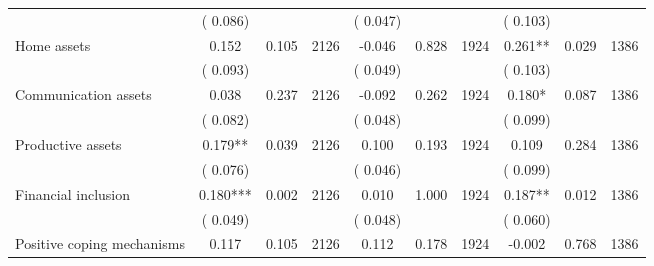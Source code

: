 \begin{tabular}{l*{9}{c}}
                               &        (       0.086) & &                                                                 &       (       0.047) & &                                                          &       (       0.103) & &  \\ 
 Home assets                 &              0.152          &        0.105 & 2126          &             -0.046 &        0.828 & 1924                   &        0.261** &        0.029 & 1386                 \\ 
                               &        (       0.093) & &                                                                 &       (       0.049) & &                                                          &       (       0.103) & &  \\ 
 Communication assets                 &              0.038          &        0.237 & 2126          &             -0.092 &        0.262 & 1924                   &        0.180* &        0.087 & 1386                 \\ 
                               &        (       0.082) & &                                                                 &       (       0.048) & &                                                          &       (       0.099) & &   \\ 
 Productive assets                 &              0.179**          &        0.039 & 2126          &              0.100 &        0.193 & 1924                   &        0.109 &        0.284 & 1386                 \\ 
                               &        (       0.076) & &                                                                 &       (       0.046) & &                                                          &       (       0.099) & &   \\ 
 Financial inclusion                 &              0.180***          &        0.002 & 2126          &              0.010 &        1.000 & 1924                   &        0.187** &        0.012 & 1386                 \\ 
                               &        (       0.049) & &                                                                 &       (       0.048) & &                                                          &       (       0.060) & &  \\ 
 Positive coping mechanisms                &              0.117        &        0.105 & 2126        &              0.112 &        0.178 & 1924               &       -0.002 &        0.768 & 1386       \\ 

\end{tabular}
